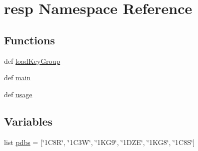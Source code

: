 \hypertarget{namespaceresp}{\section{resp Namespace Reference}
\label{namespaceresp}
}
\subsection*{Functions}
\begin{DoxyCompactItemize}
\item 
def \hyperlink{namespaceresp_a8a77e4d333ca9f1739cd4d5bf9c940b7}{load\-Key\-Group}
\item 
def \hyperlink{namespaceresp_a77988f11eb8e15ee413497dc4b8d5675}{main}
\item 
def \hyperlink{namespaceresp_af60d55ee145da465bcfd0181fe22dada}{usage}
\end{DoxyCompactItemize}
\subsection*{Variables}
\begin{DoxyCompactItemize}
\item 
list \hyperlink{namespaceresp_a548bbae2d62a9c13cfe403d63cb274f8}{pdbs} = \mbox{[}\char`\"{}1\-C8\-R\char`\"{}, \char`\"{}1\-C3\-W\char`\"{}, \char`\"{}1\-K\-G9\char`\"{}, \char`\"{}1\-D\-Z\-E\char`\"{}, \char`\"{}1\-K\-G8\char`\"{}, \char`\"{}1\-C8\-S\char`\"{}\mbox{]}
\end{DoxyCompactItemize}


